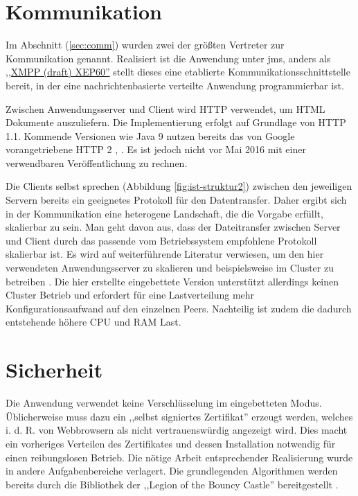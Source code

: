 \documentclass[oneside, ngerman, toc=bibliography,bibliography=totoc,listof=entryprefix, open=right,numbers=noenddot,fontsize=12pt]{scrbook}
\begin{document}
\section{Kommunikation}
Im Abschnitt (\ref{sec:comm}) wurden zwei der größten Vertreter zur Kommunikation genannt. Realisiert ist die Anwendung unter \acrshort{jms}, anders als  \href{http://xmpp.org/extensions/xep-0060.html}{,,XMPP (draft) XEP60''} stellt dieses eine etablierte Kommunikationsschnittstelle bereit, in der eine nachrichtenbasierte verteilte Anwendung programmierbar ist.

Zwischen Anwendungsserver und Client wird HTTP verwendet, um HTML Dokumente auszuliefern. Die Implementierung erfolgt auf Grundlage von HTTP 1.1. Kommende Versionen wie Java 9 nutzen bereits das von Google vorangetriebene HTTP 2 \cite{httpx1}, \cite{httpx2}. Es ist jedoch nicht vor Mai 2016 mit einer verwendbaren Veröffentlichung zu rechnen.

Die Clients selbst sprechen  (Abbildung \ref{fig:ist-struktur2}) zwischen den jeweiligen Servern bereits ein geeignetes Protokoll für den Datentransfer. Daher ergibt sich in der Kommunikation eine heterogene Landschaft, die die Vorgabe erfüllt, skalierbar zu sein. Man geht davon aus, dass der Dateitransfer zwischen Server und Client durch das passende vom Betriebssystem empfohlene Protokoll skalierbar ist. Es wird auf weiterführende Literatur verwiesen, um den hier verwendeten Anwendungsserver zu skalieren und beispielsweise im Cluster zu betreiben \cite{glassfishcluster}.
Die hier erstellte eingebettete Version unterstützt allerdings keinen Cluster Betrieb und erfordert für eine Lastverteilung mehr Konfigurationsaufwand auf den einzelnen Peers. Nachteilig ist zudem die dadurch entstehende höhere CPU und RAM Last.
 
\section{Sicherheit}
Die Anwendung verwendet keine Verschlüsselung im eingebetteten Modus. Üblicherweise muss dazu ein ,,selbst signiertes Zertifikat'' erzeugt werden, welches i. d. R. von Webbrowsern als nicht vertrauenswürdig angezeigt wird. Dies macht ein vorheriges Verteilen des Zertifikates und dessen Installation notwendig für einen reibungslosen Betrieb. Die nötige Arbeit entsprechender Realisierung wurde in andere Aufgabenbereiche verlagert. Die grundlegenden Algorithmen werden bereits durch die Bibliothek der ,,Legion of the Bouncy Castle'' bereitgestellt \cite{javabc}.
\end{document}
